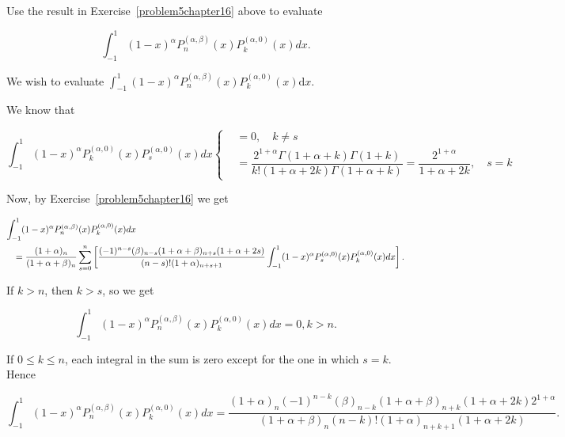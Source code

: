 \begin{problem}\label{problem7chapter16}
Use the result in Exercise~\ref{problem5chapter16} above to evaluate

$$\displaystyle\int_{-1}^1 (1-x)^{\alpha}P_n^{(\alpha,\beta)}(x)P_k^{(\alpha,0)}(x)dx.$$
\end{problem}
\begin{solution}
We wish to evaluate $\displaystyle\int_{-1}^1 (1-x)^{\alpha} P_n^{(\alpha,\beta)}(x) P_k^{(\alpha,0)}(x) \mathrm{d}x.$

We know that

$$\displaystyle\int_{-1}^1 (1-x)^{\alpha} P_k^{(\alpha,0)}(x) P_s^{(\alpha,0)}(x) dx  \left\{ \begin{array}{ll}
&=0, \quad k\neq s \\
&= \dfrac{2^{1+\alpha}\Gamma(1+\alpha+k) \Gamma(1+k)}{k! (1+\alpha+2k) \Gamma(1+\alpha+k)} = \dfrac{2^{1+\alpha}}{1+\alpha+2k}, \quad s=k
\end{array} \right.$$

Now, by Exercise~\ref{problem5chapter16} we get

\begin{eqnarray*}
\lefteqn{\displaystyle\int_{-1}^1 (1-x)^{\alpha} P_n^{(\alpha,\beta)}(x) P_k^{(\alpha,0)}(x) dx } \\
&& = \dfrac{(1+\alpha)_n}{(1+\alpha+\beta)_n} \displaystyle\sum_{s=0}^n \left[ \dfrac{(-1)^{n-s} (\beta)_{n-s} (1+\alpha+\beta)_{n+s} (1+\alpha+2s)}{(n-s)! (1+\alpha)_{n+s+1}} \displaystyle\int_{-1}^1 (1-x)^{\alpha} P_s^{(\alpha,0)}(x) P_k^{(\alpha,0)}(x) dx \right].
\end{eqnarray*}

If $k>n$, then $k>s$, so we get

$$\displaystyle\int_{-1}^1 (1-x)^{\alpha} P_n^{(\alpha,\beta)}(x) P_k^{(\alpha,0)}(x) dx = 0, k >n.$$

If $0 \leq k \leq n$, each integral in the sum is zero except for the one in which $s=k$. Hence

$$\displaystyle\int_{-1}^1 (1-x)^{\alpha} P_n^{(\alpha,\beta)}(x) P_k^{(\alpha,0)}(x) dx = \dfrac{(1+\alpha)_n (-1)^{n-k} (\beta)_{n-k} (1+\alpha+\beta)_{n+k} (1+\alpha+2k) 2^{1+\alpha}}{(1+\alpha+\beta)_n (n-k)! (1+\alpha)_{n+k+1} (1+\alpha+2k)}.$$
\end{solution}
